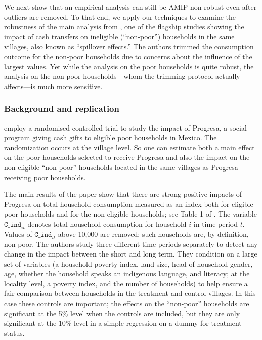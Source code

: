 We next show that an empirical analysis can still be AMIP-non-robust even after
outliers are removed. To that end, we apply our techniques to examine the
robustness of the main analysis from \citet{angelucci2009indirect}, one of the
flagship studies showing the impact of cash transfers on ineligible
(``non-poor'') households in the same villages, also known as ``spillover
effects.'' The authors trimmed the consumption outcome for the non-poor
households due to concerns about the influence of the largest values. Yet while
the analysis on the poor households is quite robust, the analysis on the
non-poor households---whom the trimming protocol actually affects---is much more
sensitive.

\subsubsection{Background and replication}

\citet{angelucci2009indirect} employ a randomised controlled trial to study the
impact of Progresa, a social program giving cash gifts to eligible poor
households in Mexico. The randomization occurs at the village level. So one can
estimate both a main effect on the poor households selected to receive Progresa
and also the impact on the non-eligible ``non-poor'' households located in the
same villages as Progresa-receiving poor households.

The main results of the paper show that there are strong positive impacts of
Progresa on total household consumption measured as an index both for eligible
poor households and for the non-eligible households; see Table 1 of
\citet{angelucci2009indirect}. The variable $\texttt{C\_ind}_{it}$ denotes total
household consumption for household $i$ in time period $t$. Values of
$\texttt{C\_ind}_{it}$ above 10,000 are removed; such households are, by
definition, non-poor. The authors study three different time periods separately
to detect any change in the impact between the short and long term. They
condition on a large set of variables (a household poverty index, land size,
head of household gender, age, whether the household speaks an indigenous
language, and literacy; at the locality level, a poverty index, and the number
of households) to help ensure a fair comparison between households in the
treatment and control villages. In this case these controls are important; the
effects on the ``non-poor'' households are significant at the 5\% level when the
controls are included, but they are only significant at the 10\% level in a
simple regression on a dummy for treatment status.

